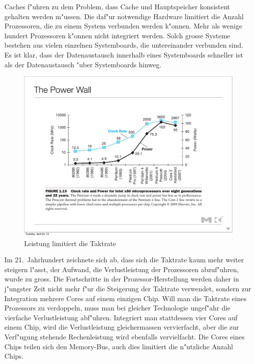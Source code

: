 Caches f"uhren zu dem Problem, dass Cache und Hauptspeicher konsistent
gehalten werden m"ussen. Die daf"ur notwendige Hardware limitiert die
Anzahl Prozessoren, die zu einem System verbunden werden k"onnen.
Mehr als wenige hundert Prozessoren k"onnen nicht integriert werden.
Solch grosse Systeme bestehen aus vielen einzelnen Systemboards, die
untereinander verbunden sind. Es ist klar, dass der Datenaustausch
innerhalb eines Systemboards schneller ist als der Datenaustausch
"uber Systemboards hinweg.

\begin{figure}
\begin{center}
\includegraphics[width=\hsize]{images/powerwall.pdf}
\end{center}
\caption{Leistung limitiert die Taktrate\label{powerwall}}
\end{figure}
Im 21.~Jahrhundert zeichnete sich ab, dass sich die Taktrate kaum mehr
weiter steigern l"asst, der Aufwand, die Verlustleistung der Prozessoren
abzuf"uhren, wurde zu gross.
Die Fortschritte in der Prozessor-Herstellung werden daher in 
j"ungster Zeit nicht mehr f"ur die Steigerung der Taktrate
verwendet, sondern zur Integration mehrere Cores auf einem
einzigen Chip.
Will man die Taktrate eines Prozessors zu verdoppeln, muss man
bei gleicher Technologie ungef"ahr
die vierfache Verlustleistung abf"uhren. Integriert man stattdessen
vier Cores auf einem Chip, wird die Verlustleistung gleichermassen 
vervierfacht, aber die zur Verf"ugung stehende Rechenleistung
wird ebenfalls vervielfacht. Die Cores eines Chips teilen sich
den Memory-Bus, auch dies limitiert die n"utzliche Anzahl Chips.


